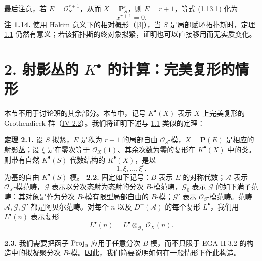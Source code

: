 最后注意，若 \(E=\mathcal O_S^{r+1}\)，从而 \(X=\mathbf P_S^r\)，则 \(E=r+1\)，等式 (1.13.1) 化为
\begin{equation}\tag{1.13.2}
 x^{r+1}=0.
\end{equation}
\textbf{注 1.14.} 使用 Hakim 意义下的相对概形（[3]），当 \(S\) 是局部赋环拓扑斯时，\hyperlink{sga6.e06.thm.1-1}{定理 1.1} 仍然有意义；若该拓扑斯的终对象拟紧，证明也可以直接移用而无实质变化。

\section*{2. 射影丛的 \(K^\bullet\) 的计算：完美复形的情形}

本节不用于讨论班的其余部分。本节中，记号 \(K^\bullet(X)\) 表示 \(X\) 上完美复形的 Grothendieck 群（\hyperlink{sga6.e04.def.2-2}{IV 2.2}）。我们将证明下述与 \hyperlink{sga6.e06.thm.1-1}{1.1} 类似的定理：

\textbf{定理 2.1.} 设 \(S\) 拟紧，\(E\) 是秩为 \(r+1\) 的局部自由 \(\mathcal O_S\)-模，\(X=\mathbf P(E)\) 是相应的射影丛；设 \(\xi\) 是在零次等于 \(\mathcal O_X(1)\)、其余次数为零的复形在 \(K^\bullet(X)\) 中的类。则带有自然 \(K^\bullet(S)\)-代数结构的 \(K^\bullet(X)\)，是以
\[
  1,\xi,\ldots,\xi^r .
\]
为基的自由 \(K^\bullet(S)\)-模。
\noindent\textbf{2.2.}
固定如下记号：\(B\) 表示 \(E\) 的对称代数；\(\mathcal A\) 表示 \(\mathcal O_X\)-模范畴，\(\mathcal G\) 表示以分次态射为态射的分次 \(B\)-模范畴，\(\mathcal G_0\) 表示 \(\mathcal G\) 的如下满子范畴：其对象是作为分次 \(B\)-模有限型局部自由的 \(B\)-模；\(\mathcal G'\) 表示 \(\mathcal O_S\)-模范畴。范畴 \(\mathcal A,\mathcal G,\mathcal G'\) 都是阿贝尔范畴。对每个 \(n\) 以及 \(D^+(\mathcal A)\) 的每个复形 \(L^\bullet\)，我们用 \(L^\bullet(n)\) 表示复形
\[
  L^\bullet(n)=L^\bullet\otimes_{\mathcal O_X}\mathcal O_X(n).
\]

\noindent\textbf{2.3.}
我们需要把函子 \(\operatorname{Proj}_0\) 应用于任意分次 \(B\)-模，而不只限于 EGA II 3.2 的构造中的拟凝聚分次 \(B\)-模。因此，我们简要说明如何在一般情形下作此构造。

